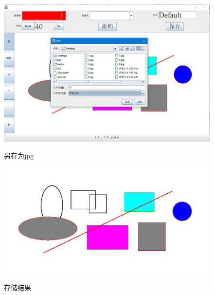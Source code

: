 \documentclass{ctexart}
\begin{document}
\begin{figure}[htbp]
    \centering
    \caption{另存为jpg}
    \includegraphics[scale = 0.4]{11.jpg}
    \label{fig:10}
\end{figure}
\begin{figure}[htbp]
    \centering
    \caption{存储结果}
    \includegraphics[scale = 0.35]{10.jpg}
    \label{fig:11}
\end{figure}
\newpage
\end{document}
